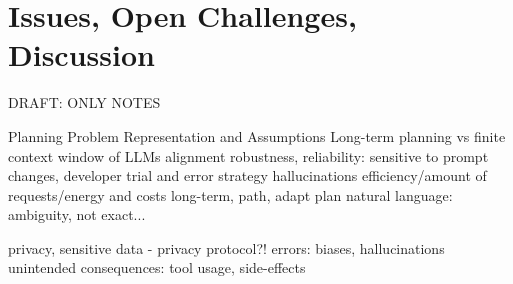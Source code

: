 \documentclass{article}
\begin{document}
%


\section{Issues, Open Challenges, Discussion}
DRAFT: ONLY NOTES

Planning Problem Representation and Assumptions 
Long-term planning vs finite context window of LLMs
alignment
robustness, reliability: sensitive to prompt changes, developer trial and error strategy
hallucinations
efficiency/amount of requests/energy and costs
long-term, path, adapt plan
natural language: ambiguity, not exact...

privacy, sensitive data - privacy protocol?!
errors: biases, hallucinations
unintended consequences: tool usage, side-effects
\end{document}
